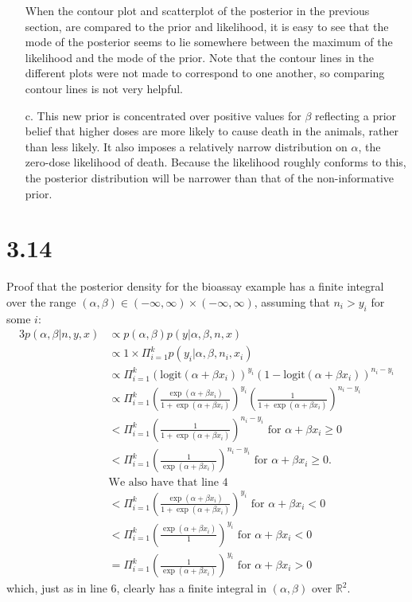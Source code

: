 \documentclass[12pt]{article}
\begin{document}
\begin{enumerate}
	When the contour plot and scatterplot of the posterior in the previous section, are compared to the prior and likelihood, it is easy to see that the mode of the posterior seems to lie somewhere between the maximum of the likelihood and the mode of the prior. Note that the contour lines in the different plots were not made to correspond to one another, so comparing contour lines is not very helpful.

	\item[c.] This new prior is concentrated over positive values for $\beta$ reflecting a prior belief that higher doses are more likely to cause death in the animals, rather than less likely. It also imposes a relatively narrow distribution on $\alpha$, the zero-dose likelihood of death. Because the likelihood roughly conforms to this, the posterior distribution will be narrower than that of the non-informative prior.
\end{enumerate}
\section*{3.14} Proof that the posterior density for the bioassay example has a finite integral over the range $(\alpha, \beta) \in (-\infty, \infty)\times(-\infty, \infty)$, assuming that $n_i>y_i$ for some $i$:
\begin{alignat*}{3}
p(\alpha,\beta|n,y,x) &\propto p(\alpha,\beta)p(y | \alpha, \beta, n, x) \\
&\propto 1 \times \Pi_{i=1}^k p(y_i | \alpha, \beta, n_i, x_i) \\
&\propto \Pi_{i=1}^k \left(\text{logit}(\alpha+\beta x_i)\right)^{y_i} \left(1- \text{logit}(\alpha+\beta x_i) \right)^{n_i-y_i} \\
&\propto \Pi_{i=1}^k \left(\frac{\exp(\alpha+\beta x_i)}{1+\exp(\alpha+\beta x_i)}\right)^{y_i} \left(\frac{1}{1+\exp(\alpha+\beta x_i)} \right)^{n_i-y_i} \\
& < \Pi_{i=1}^k \left(\frac{1}{1+\exp(\alpha+\beta x_i)} \right)^{n_i-y_i} \text{ for $\alpha+\beta x_i \geq 0$}\\
& < \Pi_{i=1}^k \left(\frac{1}{\exp(\alpha+\beta x_i)} \right)^{n_i-y_i} \text{ for $\alpha+\beta x_i \geq 0$.} \\
&\text{We also have that line 4} \\
& < \Pi_{i=1}^k \left(\frac{\exp(\alpha+\beta x_i)}{1+\exp(\alpha+\beta x_i)}\right)^{y_i} \text{ for $\alpha+\beta x_i < 0$} \\
& < \Pi_{i=1}^k \left(\frac{\exp(\alpha+\beta x_i)}{1}\right)^{y_i} \text{ for $\alpha+\beta x_i < 0$} \\
& = \Pi_{i=1}^k \left(\frac{1}{\exp(\alpha+\beta x_i)}\right)^{y_i} \text{ for $\alpha+\beta x_i > 0$}
\end{alignat*}
which, just as in line 6, clearly has a finite integral in $(\alpha,\beta)$ over $\mathbb{R}^2$.
\end{document}
